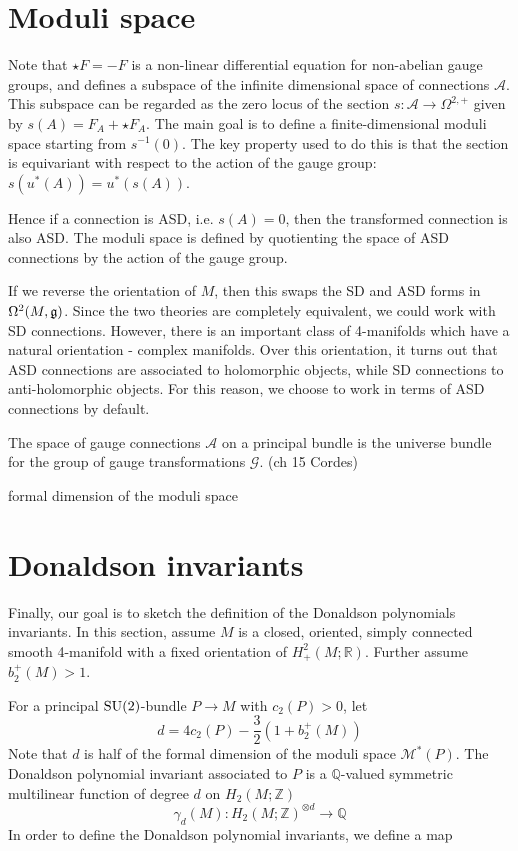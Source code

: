 \section{Moduli space}
Note that $\star F = - F$ is a non-linear differential equation for
non-abelian gauge groups, and defines a subspace of the infinite dimensional
space of connections $\mathcal{A}$. This subspace can be regarded as the zero
locus of the section $s : \mathcal{A} \to \Omega^{2,+}$ given by $s(A) =
F_A+\star F_A$. The main goal is to define a finite-dimensional moduli space
starting from  $s^{-1}(0)$. 
The key property used to do this is that the section is equivariant with respect
to the action of the gauge group: $s(u^*(A))=u^*(s(A))$.

Hence if a connection is ASD, i.e. $s(A)=0$, then the transformed connection is
also ASD. The moduli space is defined by quotienting the space of ASD
connections by the action of the gauge group. 


\begin{remark}
If we reverse the orientation of $M$, then this swaps the SD and ASD forms in
$\Omega^2(M,\operatorname{\mathfrak{g}})$. Since the two theories are completely
equivalent, we could work with SD connections. However, there is an
important class of 4-manifolds which have a natural orientation - complex
manifolds. Over this orientation, it turns out that ASD connections are 
associated to holomorphic objects, while SD connections to anti-holomorphic
objects.\cite[p.95]{morgan} For this reason, we choose to work in terms of 
ASD connections by default.
\end{remark}

The space of gauge connections $\mathcal{A}$ on a principal bundle is the
universe bundle for the group of gauge transformations $\mathcal{G}$. (ch 15
Cordes)


formal dimension of the moduli space

\section{Donaldson invariants}
Finally, our goal is to sketch the definition of the Donaldson polynomials
invariants. 
In this section, assume $M$ is a closed,
oriented, simply connected smooth 4-manifold with a fixed orientation of
$H^2_+(M;\mathbb{R})$. Further assume $b_2^+(M) > 1$. 

For a principal $\operatorname{SU}(2)$-bundle  $P\to M$ with  $c_2(P) > 0$, let 
\[
d = 4c_2(P) - \frac{3}{2}(1+b_2^+(M))
\] 
Note that $d$ is half of the formal dimension of the moduli space
$\mathcal{M}^*(P)$. The Donaldson polynomial invariant associated to $P$ is a
$\mathbb{Q}$-valued symmetric multilinear function of degree  $d$ on  
$H_2(M;\mathbb{Z})$ 
\[
\gamma_d(M) : H_2(M;\mathbb{Z})^{\otimes d} \to \mathbb{Q}
\] 
In order to define the Donaldson polynomial invariants, we define a map 

